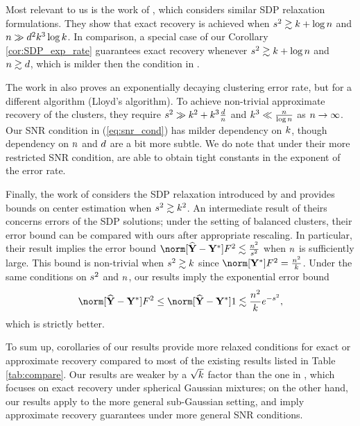 Most relevant to us is the work of \citet{li2017kmeans}, which considers
similar SDP relaxation formulations. They show that exact recovery
is achieved when $s^{2}\gtrsim k+\log n$ and $n\gg d^{2}k^{3}\log k$.
In comparison, a special case of our Corollary \ref{cor:SDP_exp_rate}
guarantees exact recovery whenever $s^{2}\gtrsim k+\log n$
and $n\gtrsim d$, which is milder then the condition in \citet{li2017kmeans}.

The work in \citet{lu2016lloyd} also proves an exponentially decaying
clustering error rate, but for a different algorithm (Lloyd's algorithm).
To achieve non-trivial approximate recovery of the clusters, they
require $s^{2}\gg k^{2}+k^{3}\frac{d}{n}$
and $k^{3}\ll\frac{n}{\log n}$ as $n\to\infty$.
Our SNR condition in (\ref{eq:snr_cond}) has milder dependency on
$k$, though dependency on $n$ and $d$ are a bit
more subtle. We do note that under their more restricted SNR condition,
\citet{lu2016lloyd} are able to obtain tight constants in the exponent
of the error rate.

Finally, the work of \citet{mixon2017clustering} considers the SDP
relaxation introduced by \citet{peng2007approximating} and provides
bounds on center estimation when $s^{2}\gtrsim k^{2}$.
An intermediate result of theirs concerns errors of the SDP solutions;
under the setting of balanced clusters, their error bound can be compared
with ours after appropriate rescaling. In particular, their result
implies the error bound $\norm[\Yhat-\Ystar]F^{2}\lesssim\frac{\num^{2}}{\snr^{2}}$
when $n$ is sufficiently large. This bound is non-trivial when
$s^{2}\gtrsim k$ since $\norm[\Ystar]F^{2}=\frac{\num^{2}}{\numclust}$.
Under the same conditions on $s^{2}$ and $n$, our results
imply the exponential error bound
\[
\norm[\Yhat-\Ystar]F^{2}\le\norm[\Yhat-\Ystar]1\lesssim\frac{\num^{2}}{\numclust}e^{-\snr^{2}},
\]
which is strictly better. 

To sum up, corollaries of our results provide more relaxed conditions
for exact or approximate recovery compared to most of the existing
results listed in Table \ref{tab:compare}. Our results are weaker
by a $\sqrt{k}$ factor than the one in \citet{vempala2004spectral},
which focuses on exact recovery under spherical Gaussian mixtures;
on the other hand, our results apply to the more general sub-Gaussian
setting, and imply approximate recovery guarantees under more general
SNR conditions. 

